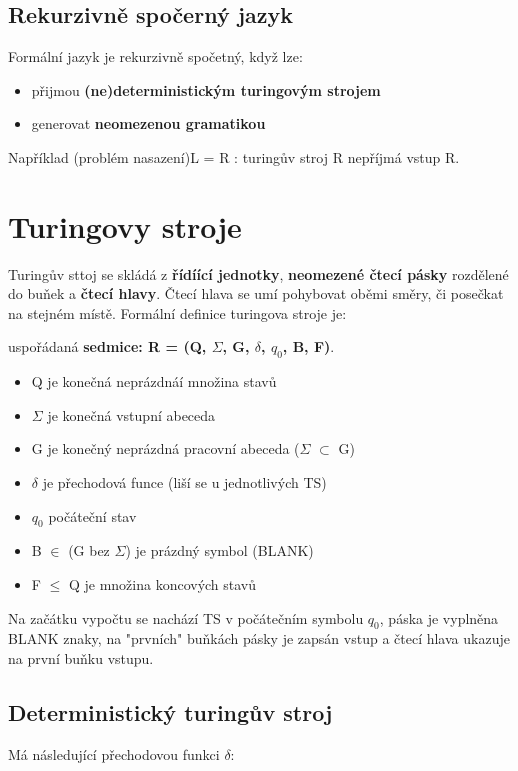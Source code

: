 \documentclass{szzclass}
\begin{document}
\subsection{Rekurzivně spočerný jazyk}
Formální jazyk je rekurzivně spočetný, když lze:
\begin{itemize}
	\item přijmou \textbf{(ne)deterministickým turingovým strojem}
	\item generovat \textbf{neomezenou gramatikou}
\end{itemize}
Například (problém nasazení)L = {R : turingův stroj R nepříjmá vstup R}.

\section{Turingovy stroje}
Turingův sttoj se skládá z \textbf{řídíící jednotky}, \textbf{neomezené čtecí pásky} rozdělené do buňek a \textbf{čtecí hlavy}.
Čtecí hlava se umí pohybovat oběmi směry, či posečkat na stejném místě.
\newline
Formální definice turingova stroje je:

uspořádaná \textbf{sedmice: R = (Q, $\Sigma$, G, $\delta$, $q_0$, B, F)}. 
\begin{itemize}
	\item Q je konečná neprázdnáí množina stavů
	\item $\Sigma$ je konečná vstupní abeceda
	\item G je konečný neprázdná pracovní abeceda ($\Sigma$ $\subset$ G)
	\item $\delta$ je přechodová funce (liší se u jednotlivých TS)
	\item $q_0$ počáteční stav
	\item B $\in$ (G bez $\Sigma$) je prázdný symbol (BLANK)
	\item F $\leq$ Q je množina koncových stavů
\end{itemize}
Na začátku vypočtu se nachází TS v počátečním symbolu $q_0$, páska je vyplněna BLANK znaky, na "prvních" buňkách pásky je zapsán vstup a čtecí hlava ukazuje na první buňku vstupu. 

\subsection{Deterministický turingův stroj}
Má následující přechodovou funkci $\delta$:
\end{document}
